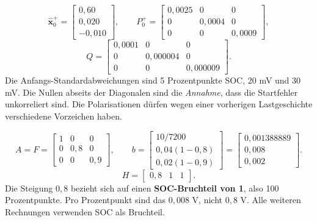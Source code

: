 \[
\hat{\mathbf x}_0^+=\begin{bmatrix}0{,}60\\0{,}020\\-0{,}010\end{bmatrix},
\qquad
P_0^+=\begin{bmatrix}0{,}0025&0&0\\0&0{,}0004&0\\0&0&0{,}0009\end{bmatrix},
\]
\[
Q=\begin{bmatrix}0{,}0001&0&0\\0&0{,}000004&0\\0&0&0{,}000009\end{bmatrix}.
\]
Die Anfangs-Standardabweichungen sind 5 Prozentpunkte SOC, 20 mV und 30 mV. Die Nullen abseits der Diagonalen sind die \emph{Annahme}, dass die Startfehler unkorreliert sind. Die Polarisationen dürfen wegen einer vorherigen Lastgeschichte verschiedene Vorzeichen haben.

\[
A=F=\begin{bmatrix}1&0&0\\0&0{,}8&0\\0&0&0{,}9\end{bmatrix},\qquad
b=\begin{bmatrix}10/7200\\0{,}04(1-0{,}8)\\0{,}02(1-0{,}9)\end{bmatrix}
=\begin{bmatrix}0{,}001388889\\0{,}008\\0{,}002\end{bmatrix}.
\]
\[
H=\begin{bmatrix}0{,}8&1&1\end{bmatrix}.
\]
Die Steigung $0{,}8$ bezieht sich auf einen \textbf{SOC-Bruchteil von 1}, also 100 Prozentpunkte. Pro Prozentpunkt sind das $0{,}008$ V, nicht $0{,}8$ V. Alle weiteren Rechnungen verwenden SOC als Bruchteil.

